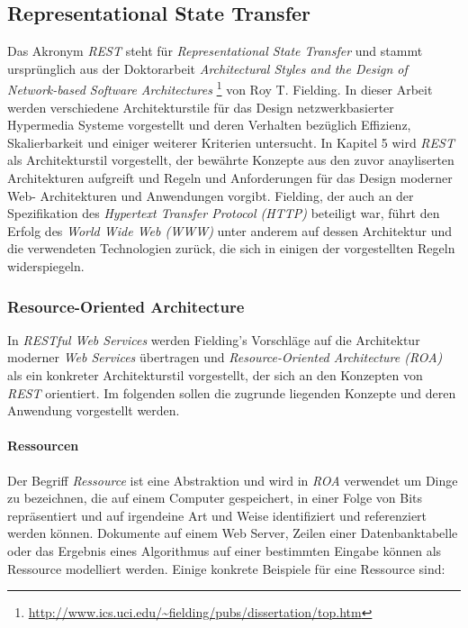 \subsection{Representational State Transfer}
\label{rest}

Das Akronym \textit{REST} steht für \textit{Representational State
  Transfer} und stammt ursprünglich aus der Doktorarbeit
\textit{Architectural Styles and the Design of Network-based Software
  Architectures} \cite{Fielding2000}
\footnote{\url{http://www.ics.uci.edu/~fielding/pubs/dissertation/top.htm}}
von Roy T. Fielding. In dieser Arbeit werden verschiedene
Architekturstile für das Design netzwerkbasierter Hypermedia Systeme
vorgestellt und deren Verhalten bezüglich Effizienz, Skalierbarkeit
und einiger weiterer Kriterien untersucht. In Kapitel 5 wird
\textit{REST} als Architekturstil vorgestellt, der bewährte Konzepte
aus den zuvor anayliserten Architekturen aufgreift und Regeln und
Anforderungen für das Design moderner Web- Architekturen und
Anwendungen vorgibt. Fielding, der auch an der Spezifikation des
\textit{Hypertext Transfer Protocol (HTTP)}
 beteiligt war, führt
den Erfolg des \textit{World Wide Web (WWW)}  unter anderem auf dessen Architektur und die verwendeten
Technologien zurück, die sich in einigen der vorgestellten Regeln
widerspiegeln.

\subsubsection{Resource-Oriented Architecture}

In \textit{RESTful Web Services} \cite{Richardson07} werden Fielding's
Vorschläge auf die Architektur moderner \textit{Web Services}
übertragen und \textit{Resource-Oriented Architecture (ROA)} als ein
konkreter Architekturstil vorgestellt, der sich an den Konzepten von
\textit{REST} orientiert. Im folgenden sollen die zugrunde liegenden
Konzepte und deren Anwendung vorgestellt werden.

\paragraph{Ressourcen}

Der Begriff \textit{Ressource} ist eine Abstraktion und wird in
\textit{ROA} verwendet um Dinge zu bezeichnen, die auf einem Computer
gespeichert, in einer Folge von Bits repräsentiert und auf irgendeine
Art und Weise identifiziert und referenziert werden können. Dokumente
auf einem Web Server, Zeilen einer Datenbanktabelle oder das Ergebnis
eines Algorithmus auf einer bestimmten Eingabe können als Ressource
modelliert werden. Einige konkrete Beispiele für eine Ressource sind:

